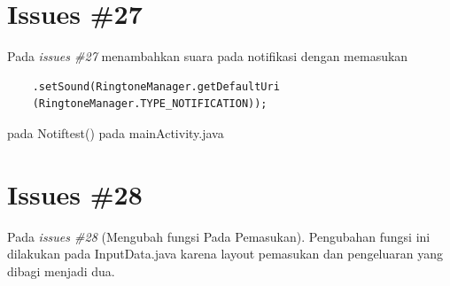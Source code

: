 \section{Issues \#27}
Pada \textit{issues \#27} menambahkan suara pada notifikasi dengan memasukan 
\begin{verbatim}
    .setSound(RingtoneManager.getDefaultUri
    (RingtoneManager.TYPE_NOTIFICATION));
\end{verbatim}
pada Notiftest() pada mainActivity.java

\section{Issues \#28}
Pada \textit{issues \#28} (Mengubah fungsi Pada Pemasukan). Pengubahan fungsi ini dilakukan pada InputData.java karena layout pemasukan dan pengeluaran yang dibagi menjadi dua.

